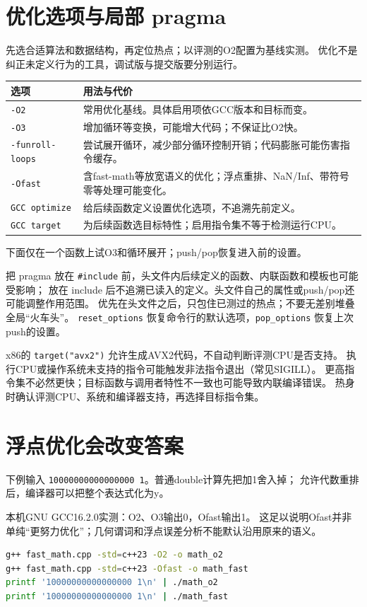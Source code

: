 \section{优化选项与局部 pragma}
先选合适算法和数据结构，再定位热点；以评测的O2配置为基线实测。
优化不是纠正未定义行为的工具，调试版与提交版要分别运行。
\begin{longtable}{p{45mm}p{114mm}}\toprule 选项 & 用法与代价\\\midrule\endhead
\texttt{-O2} & 常用优化基线。具体启用项依GCC版本和目标而变。\\
\texttt{-O3} & 增加循环等变换，可能增大代码；不保证比O2快。\\
\texttt{-funroll-loops} & 尝试展开循环，减少部分循环控制开销；代码膨胀可能伤害指令缓存。\\
\texttt{-Ofast} & 含fast-math等放宽语义的优化；浮点重排、NaN/Inf、带符号零等处理可能变化。\\
\texttt{GCC optimize} & 给后续函数定义设置优化选项，不追溯先前定义。\\
\texttt{GCC target} & 为后续函数选目标特性；启用指令集不等于检测运行CPU。\\\bottomrule
\end{longtable}
下面仅在一个函数上试O3和循环展开；push/pop恢复进入前的设置。

把 pragma 放在 \texttt{\#include} 前，头文件内后续定义的函数、内联函数和模板也可能受影响；
放在 include 后不追溯已读入的定义。头文件自己的属性或push/pop还可能调整作用范围。
优先在头文件之后，只包住已测过的热点；不要无差别堆叠全局“火车头”。
\texttt{reset\_options} 恢复命令行的默认选项，\texttt{pop\_options} 恢复上次push的设置。

x86的 \texttt{target("avx2")} 允许生成AVX2代码，不自动判断评测CPU是否支持。
执行CPU或操作系统未支持的指令可能触发非法指令退出（常见SIGILL）。
更高指令集不必然更快；目标函数与调用者特性不一致也可能导致内联编译错误。
热身时确认评测CPU、系统和编译器支持，再选择目标指令集。

\newpage
\section{浮点优化会改变答案}
下例输入 \texttt{10000000000000000 1}。普通double计算先把加1舍入掉；
允许代数重排后，编译器可以把整个表达式化为y。

本机GNU GCC16.2.0实测：O2、O3输出0，Ofast输出1。
这足以说明Ofast并非单纯“更努力优化”；几何谓词和浮点误差分析不能默认沿用原来的语义。
\begin{lstlisting}[language=bash]
g++ fast_math.cpp -std=c++23 -O2 -o math_o2
g++ fast_math.cpp -std=c++23 -Ofast -o math_fast
printf '10000000000000000 1\n' | ./math_o2
printf '10000000000000000 1\n' | ./math_fast
\end{lstlisting}

